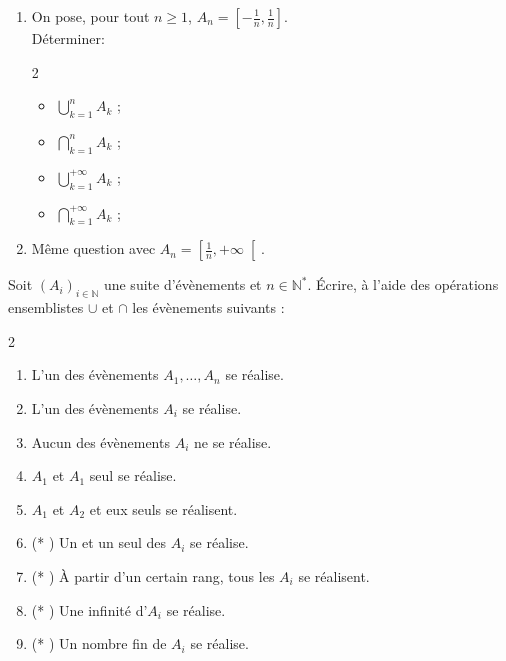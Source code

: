 \documentclass[../PolyS4.tex]{subfiles}
\begin{document}

\begin{enumerate}
\item On pose, pour tout $n \geq 1$, $A_n = \left[-\frac{1}{n}, \frac{1}{n}\right]$.\\
Déterminer:
\begin{multicols}{2}
\begin{itemize}
    \item $\bigcup_{k=1}^{n} A_k$ ;
    \item $\bigcap_{k=1}^{n} A_k$ ;
    \item $\bigcup_{k=1}^{+\infty} A_k$ ;

    \item $\bigcap_{k=1}^{+\infty} A_k$ ;

\end{itemize}
\end{multicols}
\item Même question avec $A_n =\left [\frac{1}{n}, +\infty\right[$.\\
\end{enumerate}



Soit $(A_i)_{i \in \mathbb{N}}$ une suite d'évènements et $n \in \mathbb{N}^*$. Écrire, à l'aide des opérations ensemblistes $\cup$ et $\cap$ les évènements suivants :
\begin{multicols}{2}
\begin{enumerate}
    \item L'un des évènements $A_1, \ldots, A_n$ se réalise.
    \item L'un des évènements $A_i$ se réalise.
    \item Aucun des évènements $A_i$ ne se réalise.
    \item $A_1$ et $A_1$ seul se réalise.
    \item $A_1$ et $A_2$ et eux seuls se réalisent.
    \item (* ) Un et un seul des $A_i$ se réalise.
    \item (* ) À partir d'un certain rang, tous les $A_i$ se réalisent.
    \item (* ) Une infinité d'$A_i$ se réalise.
    \item (* ) Un nombre fin de $A_i$ se réalise.\\
\end{enumerate}
\end{multicols}
\end{document}
